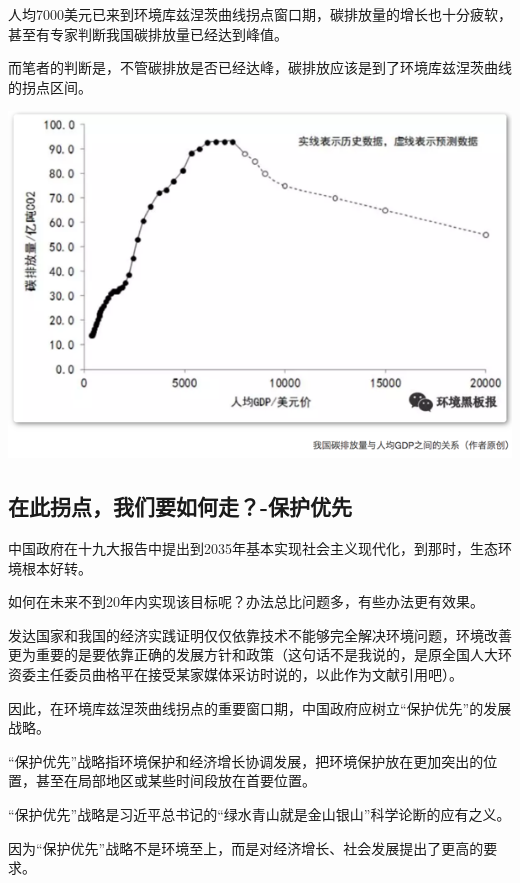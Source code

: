 \documentclass[
]{book}
\begin{document}
人均7000美元已来到环境库兹涅茨曲线拐点窗口期，碳排放量的增长也十分疲软，甚至有专家判断我国碳排放量已经达到峰值。

而笔者的判断是，不管碳排放是否已经达峰，碳排放应该是到了环境库兹涅茨曲线的拐点区间。

\includegraphics[width=8.33in]{images/huanjing2}

\hypertarget{ux5728ux6b64ux62d0ux70b9ux6211ux4eecux8981ux5982ux4f55ux8d70-ux4fddux62a4ux4f18ux5148}{%
\subsection{在此拐点，我们要如何走？-保护优先}\label{ux5728ux6b64ux62d0ux70b9ux6211ux4eecux8981ux5982ux4f55ux8d70-ux4fddux62a4ux4f18ux5148}}

中国政府在十九大报告中提出到2035年基本实现社会主义现代化，到那时，生态环境根本好转。

如何在未来不到20年内实现该目标呢？办法总比问题多，有些办法更有效果。

发达国家和我国的经济实践证明仅仅依靠技术不能够完全解决环境问题，环境改善更为重要的是要依靠正确的发展方针和政策（这句话不是我说的，是原全国人大环资委主任委员曲格平在接受某家媒体采访时说的，以此作为文献引用吧）。

因此，在环境库兹涅茨曲线拐点的重要窗口期，中国政府应树立``保护优先''的发展战略。

``保护优先''战略指环境保护和经济增长协调发展，把环境保护放在更加突出的位置，甚至在局部地区或某些时间段放在首要位置。

``保护优先''战略是习近平总书记的``绿水青山就是金山银山''科学论断的应有之义。

因为``保护优先''战略不是环境至上，而是对经济增长、社会发展提出了更高的要求。
\end{document}
